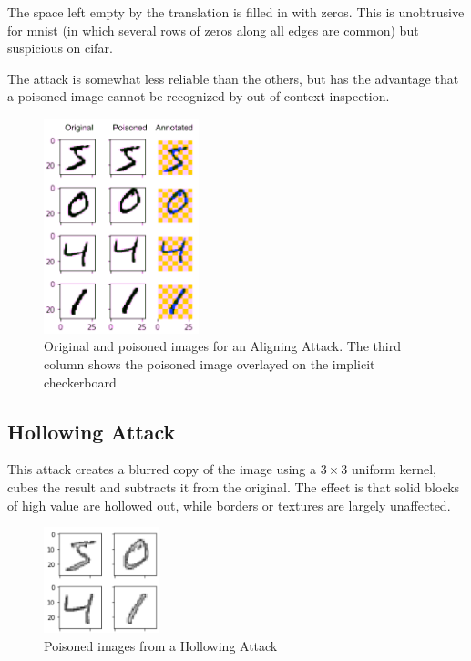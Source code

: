 \documentclass[letterpaper, 10 pt, conference]{ieeeconf}  %
\begin{document}
The space left empty by the translation is filled in with zeros.  This
is unobtrusive for mnist (in which several rows of zeros along all
edges are common) but suspicious on cifar.

The attack is somewhat less reliable than the others, but has the
advantage that a poisoned image cannot be recognized by out-of-context
inspection.

\begin{figure}[h]
\centering
\includegraphics[width=0.4\textwidth]{aligner.png}
\caption{Original and poisoned images for an Aligning Attack.  The third column shows the poisoned image overlayed on the implicit checkerboard}
\end{figure}

\subsection{Hollowing Attack}

This attack creates a blurred copy of the image using a $3\times 3$
uniform kernel, cubes the result and subtracts it from the original.
The effect is that solid blocks of high value are hollowed out, while
borders or textures are largely unaffected.

\begin{figure}[h]
\centering
\includegraphics[width=0.3\textwidth]{hollow.png}
\caption{Poisoned images from a Hollowing Attack}
\end{figure}
\end{document}
